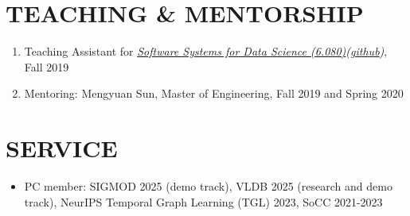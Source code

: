 \documentclass[centered,overlapped]{res}
\begin{document}
\begin{resume}
\begin{enumerate}
\end{enumerate}

\section{TEACHING \& MENTORSHIP}
\begin{enumerate}
  \item Teaching Assistant for {\sl \href{http://dsg.csail.mit.edu/6.S080/}{Software Systems for Data Science (6.080)}(\href{https://github.com/mitdbg/datascienceclass}{github})}, Fall 2019
  \item Mentoring: Mengyuan Sun, Master of Engineering, Fall 2019 and Spring 2020
\end{enumerate}

\section{SERVICE}
  \begin{itemize}  \itemsep -2pt
  \item PC member: SIGMOD 2025 (demo track), VLDB 2025 (research and demo track), NeurIPS Temporal Graph Learning (TGL) 2023, SoCC 2021-2023
  \end{itemize}


\end{resume}
\end{document}
